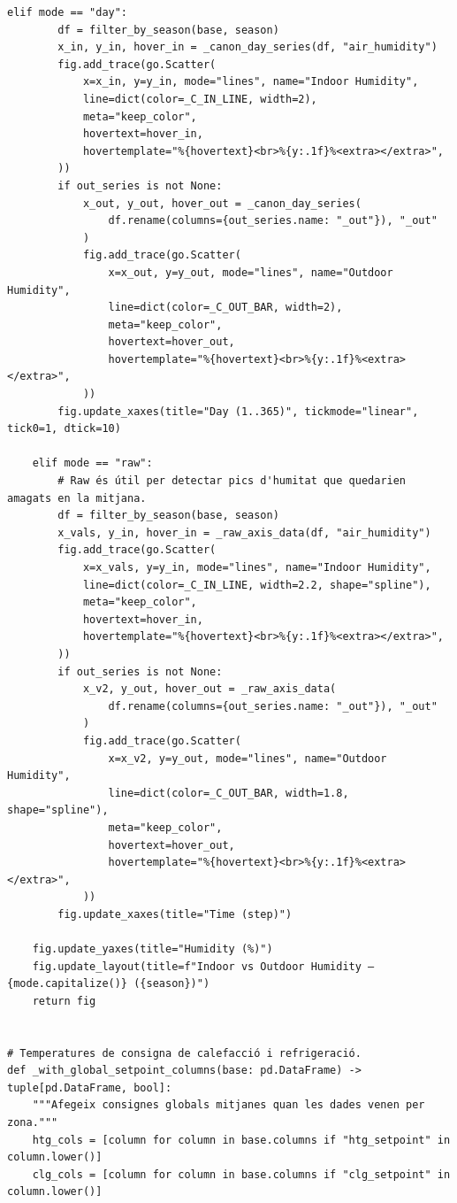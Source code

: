 \documentclass[10pt,a4paper]{article}
\begin{document}
\begin{lstlisting}[style=studioPython,caption={backend/grafics/thermal.py},label={lst:backend-grafics-thermal-py}]
    elif mode == "day":
        df = filter_by_season(base, season)
        x_in, y_in, hover_in = _canon_day_series(df, "air_humidity")
        fig.add_trace(go.Scatter(
            x=x_in, y=y_in, mode="lines", name="Indoor Humidity",
            line=dict(color=_C_IN_LINE, width=2),
            meta="keep_color",
            hovertext=hover_in,
            hovertemplate="%{hovertext}<br>%{y:.1f}%<extra></extra>",
        ))
        if out_series is not None:
            x_out, y_out, hover_out = _canon_day_series(
                df.rename(columns={out_series.name: "_out"}), "_out"
            )
            fig.add_trace(go.Scatter(
                x=x_out, y=y_out, mode="lines", name="Outdoor Humidity",
                line=dict(color=_C_OUT_BAR, width=2),
                meta="keep_color",
                hovertext=hover_out,
                hovertemplate="%{hovertext}<br>%{y:.1f}%<extra></extra>",
            ))
        fig.update_xaxes(title="Day (1..365)", tickmode="linear", tick0=1, dtick=10)

    elif mode == "raw":
        # Raw és útil per detectar pics d'humitat que quedarien amagats en la mitjana.
        df = filter_by_season(base, season)
        x_vals, y_in, hover_in = _raw_axis_data(df, "air_humidity")
        fig.add_trace(go.Scatter(
            x=x_vals, y=y_in, mode="lines", name="Indoor Humidity",
            line=dict(color=_C_IN_LINE, width=2.2, shape="spline"),
            meta="keep_color",
            hovertext=hover_in,
            hovertemplate="%{hovertext}<br>%{y:.1f}%<extra></extra>",
        ))
        if out_series is not None:
            x_v2, y_out, hover_out = _raw_axis_data(
                df.rename(columns={out_series.name: "_out"}), "_out"
            )
            fig.add_trace(go.Scatter(
                x=x_v2, y=y_out, mode="lines", name="Outdoor Humidity",
                line=dict(color=_C_OUT_BAR, width=1.8, shape="spline"),
                meta="keep_color",
                hovertext=hover_out,
                hovertemplate="%{hovertext}<br>%{y:.1f}%<extra></extra>",
            ))
        fig.update_xaxes(title="Time (step)")

    fig.update_yaxes(title="Humidity (%)")
    fig.update_layout(title=f"Indoor vs Outdoor Humidity – {mode.capitalize()} ({season})")
    return fig


# Temperatures de consigna de calefacció i refrigeració.
def _with_global_setpoint_columns(base: pd.DataFrame) -> tuple[pd.DataFrame, bool]:
    """Afegeix consignes globals mitjanes quan les dades venen per zona."""
    htg_cols = [column for column in base.columns if "htg_setpoint" in column.lower()]
    clg_cols = [column for column in base.columns if "clg_setpoint" in column.lower()]


\end{lstlisting}
\end{document}
